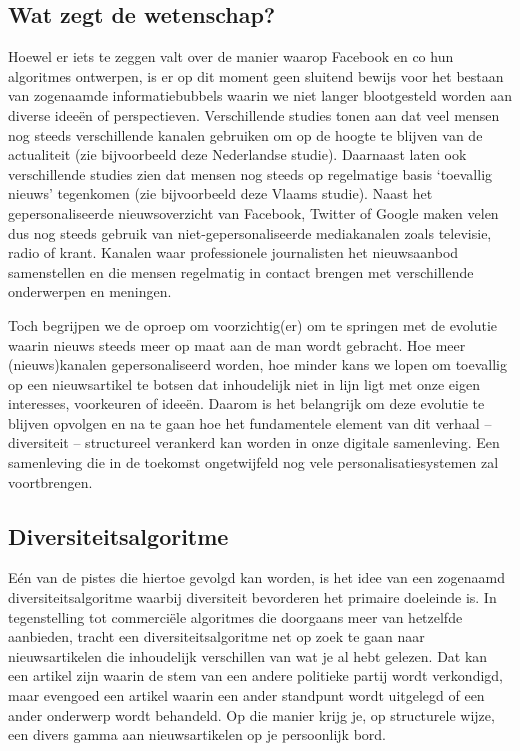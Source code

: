 \documentclass{report}
\begin{document}
\subsection{Wat zegt de wetenschap?}

Hoewel er iets te zeggen valt over de manier waarop Facebook en co hun algoritmes ontwerpen, is er op dit moment geen sluitend bewijs voor het bestaan van zogenaamde informatiebubbels waarin we niet langer blootgesteld worden aan diverse ideeën of perspectieven. Verschillende studies tonen aan dat veel mensen nog steeds verschillende kanalen gebruiken om op de hoogte te blijven van de actualiteit (zie bijvoorbeeld deze Nederlandse studie). Daarnaast laten ook verschillende studies zien dat mensen nog steeds op regelmatige basis ‘toevallig nieuws’ tegenkomen (zie bijvoorbeeld deze Vlaams studie). Naast het gepersonaliseerde nieuwsoverzicht van Facebook, Twitter of Google maken velen dus nog steeds gebruik van niet-gepersonaliseerde mediakanalen zoals televisie, radio of krant. Kanalen waar professionele journalisten het nieuwsaanbod samenstellen en die mensen regelmatig in contact brengen met verschillende onderwerpen en meningen.


Toch begrijpen we de oproep om voorzichtig(er) om te springen met de evolutie waarin nieuws steeds meer op maat aan de man wordt gebracht. Hoe meer (nieuws)kanalen gepersonaliseerd worden, hoe minder kans we lopen om toevallig op een nieuwsartikel te botsen dat inhoudelijk niet in lijn ligt met onze eigen interesses, voorkeuren of ideeën. Daarom is het belangrijk om deze evolutie te blijven
opvolgen en na te gaan hoe het fundamentele element van dit verhaal – diversiteit – structureel verankerd kan worden in onze digitale samenleving. Een samenleving die in de toekomst ongetwijfeld nog vele personalisatiesystemen zal voortbrengen.

\subsection{Diversiteitsalgoritme}

Eén van de pistes die hiertoe gevolgd kan worden, is het idee van een zogenaamd diversiteitsalgoritme waarbij diversiteit bevorderen het primaire doeleinde is. In tegenstelling tot commerciële algoritmes die doorgaans meer van hetzelfde aanbieden, tracht een diversiteitsalgoritme net op zoek te gaan naar nieuwsartikelen die inhoudelijk verschillen van wat je al hebt gelezen. Dat kan een artikel zijn waarin de stem van een andere politieke partij wordt verkondigd, maar evengoed een artikel waarin een ander standpunt wordt uitgelegd of een ander onderwerp wordt behandeld. Op die manier krijg je, op structurele wijze, een divers gamma aan nieuwsartikelen op je persoonlijk bord.
\end{document}
